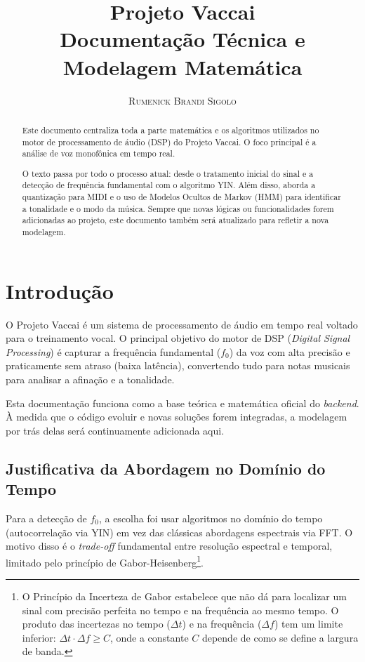 \documentclass[11pt, a4paper]{article}
\title{\textbf{\LARGE Projeto Vaccai}\\[0.2cm] \large Documentação Técnica e Modelagem Matemática}
\author{\textsc{Rumenick Brandi Sigolo}}
\theoremstyle{plain}
\theoremstyle{definition}
\begin{document}
\maketitle

\begin{center}
\begin{minipage}{0.9 \textwidth}
\begin{abstract}
\noindent Este documento centraliza toda a parte matemática e os algoritmos utilizados no motor de processamento de áudio (DSP) do Projeto Vaccai. O foco principal é a análise de voz monofônica em tempo real.

O texto passa por todo o processo atual: desde o tratamento inicial do sinal e a detecção de frequência fundamental com o algoritmo YIN. Além disso, aborda a quantização para MIDI e o uso de Modelos Ocultos de Markov (HMM) para identificar a tonalidade e o modo da música. Sempre que novas lógicas ou funcionalidades forem adicionadas ao projeto, este documento também será atualizado para refletir a nova modelagem.
\end{abstract}
\end{minipage}
\end{center}

\vspace{0.5cm}

\section{Introdução}
O Projeto Vaccai é um sistema de processamento de áudio em tempo real voltado para o treinamento vocal. O principal objetivo do motor de DSP (\textit{Digital Signal Processing}) é capturar a frequência fundamental ($f_0$) da voz com alta precisão e praticamente sem atraso (baixa latência), convertendo tudo para notas musicais para analisar a afinação e a tonalidade.

Esta documentação funciona como a base teórica e matemática oficial do \textit{backend}. À medida que o código evoluir e novas soluções forem integradas, a modelagem por trás delas será continuamente adicionada aqui.

\subsection{Justificativa da Abordagem no Domínio do Tempo}

Para a detecção de $f_0$, a escolha foi usar algoritmos no domínio do tempo (autocorrelação via YIN) em vez das clássicas abordagens espectrais via FFT. O motivo disso é o \textit{trade-off} fundamental entre resolução espectral e temporal, limitado pelo princípio de Gabor-Heisenberg\footnote{O Princípio da Incerteza de Gabor estabelece que não dá para localizar um sinal com precisão perfeita no tempo e na frequência ao mesmo tempo. O produto das incertezas no tempo ($\Delta t$) e na frequência ($\Delta f$) tem um limite inferior: $\Delta t \cdot \Delta f \ge C$, onde a constante $C$ depende de como se define a largura de banda.}.
\end{document}
